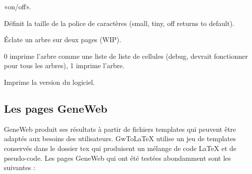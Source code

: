 \begin{description}[style=nextline]
\item[Arbres/Trees] «on/off».
\item[FontSize] Définit la taille de la police de caractères\label{fontsize}
(small, tiny, off returns to default).
\item[TwoPages] Éclate un arbre sur deux pages (WIP).
\item[TreeMode] 0 imprime l'arbre comme une liste de liste de cellules
(debug, devrait fonctionner pour tous les arbres), 1 imprime l'arbre.

\item[Version] Imprime la version du logiciel.
\end{description}

\subsection{Les pages GeneWeb}

GeneWeb produit ses résultats à partir de fichiers templates qui peuvent être
adaptés aux besoins des utilisateurs.
GwToLaTeX utilise un jeu de templates conservés dans le dossier tex qui
produisent un mélange de code LaTeX et de pseudo-code.
Les pages GeneWeb qui ont été testées abondamment sont les suivantes :


